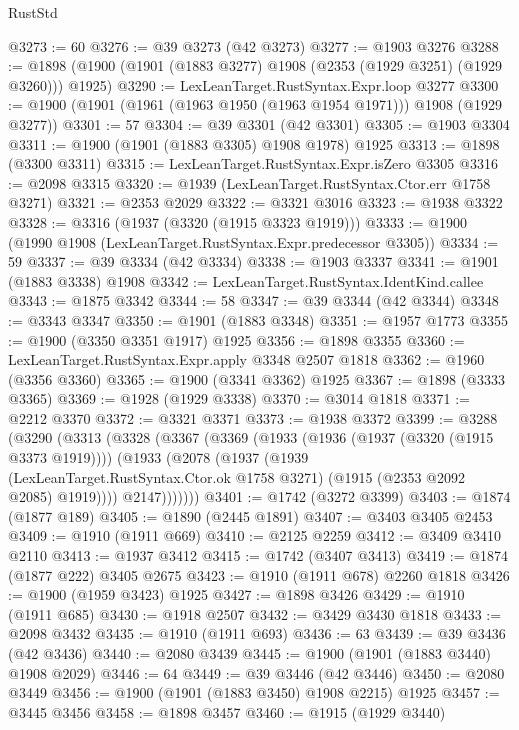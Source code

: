 \begin{lexlean}{RustStd}
\begin{coremodule}
{\begin{coremodule}
{{{{{{{{{{{{{{{{{{{{{{{{{{{{{{{{{{{{{{{{{{{@3273 := 60
@3276 := @39 @3273 (@42 @3273)
@3277 := @1903 @3276
@3288 := @1898 (@1900 (@1901 (@1883 @3277) @1908 (@2353 (@1929 @3251) (@1929 @3260))) @1925)
@3290 := LexLeanTarget.RustSyntax.Expr.loop @3277
@3300 := @1900 (@1901 (@1961 (@1963 @1950 (@1963 @1954 @1971))) @1908 (@1929 @3277))
@3301 := 57
@3304 := @39 @3301 (@42 @3301)
@3305 := @1903 @3304
@3311 := @1900 (@1901 (@1883 @3305) @1908 @1978) @1925
@3313 := @1898 (@3300 @3311)
@3315 := LexLeanTarget.RustSyntax.Expr.isZero @3305
@3316 := @2098 @3315
@3320 := @1939 (LexLeanTarget.RustSyntax.Ctor.err @1758 @3271)
@3321 := @2353 @2029
@3322 := @3321 @3016
@3323 := @1938 @3322
@3328 := @3316 (@1937 (@3320 (@1915 @3323 @1919)))
@3333 := @1900 (@1990 @1908 (LexLeanTarget.RustSyntax.Expr.predecessor @3305))
@3334 := 59
@3337 := @39 @3334 (@42 @3334)
@3338 := @1903 @3337
@3341 := @1901 (@1883 @3338) @1908
@3342 := LexLeanTarget.RustSyntax.IdentKind.callee
@3343 := @1875 @3342
@3344 := 58
@3347 := @39 @3344 (@42 @3344)
@3348 := @3343 @3347
@3350 := @1901 (@1883 @3348)
@3351 := @1957 @1773
@3355 := @1900 (@3350 @3351 @1917) @1925
@3356 := @1898 @3355
@3360 := LexLeanTarget.RustSyntax.Expr.apply @3348 @2507 @1818
@3362 := @1960 (@3356 @3360)
@3365 := @1900 (@3341 @3362) @1925
@3367 := @1898 (@3333 @3365)
@3369 := @1928 (@1929 @3338)
@3370 := @3014 @1818
@3371 := @2212 @3370
@3372 := @3321 @3371
@3373 := @1938 @3372
@3399 := @3288
    (@3290
      (@3313
        (@3328
          (@3367
            (@3369
              (@1933
                (@1936 (@1937 (@3320 (@1915 @3373 @1919))))
                (@1933
                  (@2078
                    (@1937
                      (@1939
                        (LexLeanTarget.RustSyntax.Ctor.ok @1758 @3271)
                        (@1915 (@2353 @2092 @2085) @1919))))
                  @2147)))))))
@3401 := @1742 (@3272 @3399)
@3403 := @1874 (@1877 @189)
@3405 := @1890 (@2445 @1891)
@3407 := @3403 @3405 @2453
@3409 := @1910 (@1911 @669)
@3410 := @2125 @2259
@3412 := @3409 @3410 @2110
@3413 := @1937 @3412
@3415 := @1742 (@3407 @3413)
@3419 := @1874 (@1877 @222) @3405 @2675
@3423 := @1910 (@1911 @678) @2260 @1818
@3426 := @1900 (@1959 @3423) @1925
@3427 := @1898 @3426
@3429 := @1910 (@1911 @685)
@3430 := @1918 @2507
@3432 := @3429 @3430 @1818
@3433 := @2098 @3432
@3435 := @1910 (@1911 @693)
@3436 := 63
@3439 := @39 @3436 (@42 @3436)
@3440 := @2080 @3439
@3445 := @1900 (@1901 (@1883 @3440) @1908 @2029)
@3446 := 64
@3449 := @39 @3446 (@42 @3446)
@3450 := @2080 @3449
@3456 := @1900 (@1901 (@1883 @3450) @1908 @2215) @1925
@3457 := @3445 @3456
@3458 := @1898 @3457
@3460 := @1915 (@1929 @3440)
}}}}}}}}}}}}}}}}}}}}}}}}}}}}}}}}}}}}}}}}}}}
\end{coremodule}}
\end{coremodule}
\end{lexlean}
